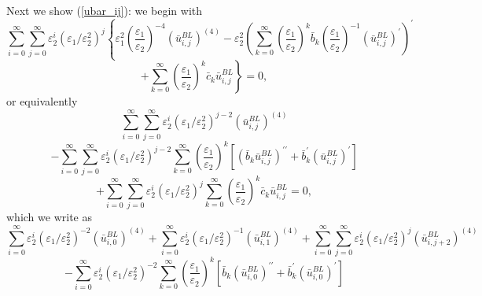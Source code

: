\documentclass[12pt]{article}
\begin{document}
Next we show (\ref{ubar_ij}): we begin with
%
\begin{equation*}
\sum_{i=0}^{\infty }\sum_{j=0}^{\infty }\varepsilon _{2}^{i}(\varepsilon
_{1}/\varepsilon _{2}^{2})^{j}\left\{ \varepsilon _{1}^{2}\left( \frac{\varepsilon
_{1}}{\varepsilon _{2}}\right) ^{-4}\left(\bar{u}^{BL}_{i,j}\right)^{(4)}-\varepsilon
_{2}^{2}\left( \sum_{k=0}^{\infty }\left( \frac{\varepsilon _{1}}{\varepsilon _{2}}%
\right) ^{k} \bar{b}_{k}\left( \frac{\varepsilon
_{1}}{\varepsilon _{2}}\right) ^{-1}\left(\bar{u}^{BL}_{i,j}\right)^{\prime }\right)
^{\prime } \right.
\end{equation*}
%
\begin{equation*}
\left. +\sum_{k=0}^{\infty }\left( \frac{\varepsilon _{1}}{\varepsilon
_{2}}\right) ^{k}\bar{c}_{k}\bar{u}^{BL}_{i,j}\right\} =0,
\end{equation*}
%
or equivalently
%
\begin{equation*}
\sum_{i=0}^{\infty }\sum_{j=0}^{\infty }\varepsilon _{2}^{i}(\varepsilon
_{1}/\varepsilon _{2}^{2})^{j-2}\left(\bar{u}^{BL}_{i,j}\right)^{(4)} 
\end{equation*}
\begin{equation*}
-\sum_{i=0}^{\infty
}\sum_{j=0}^{\infty }\varepsilon _{2}^{i}(\varepsilon _{1}/\varepsilon
_{2}^{2})^{j-2}\sum_{k=0}^{\infty }\left( \frac{\varepsilon _{1}}{\varepsilon _{2}}%
\right) ^{k}\left[ \left(\bar{b}_{k}\bar{u}^{BL}_{i,j}\right)^{\prime \prime }+\bar{b}_{k}^{\prime }\left(\bar{u}^{BL}_{i,j}\right)^{\prime }\right]
\end{equation*}
%
\begin{equation*}
+\sum_{i=0}^{\infty }\sum_{j=0}^{\infty }\varepsilon _{2}^{i}(\varepsilon
_{1}/\varepsilon _{2}^{2})^{j}\sum_{k=0}^{\infty }\left( \frac{\varepsilon
_{1}}{\varepsilon _{2}}\right) ^{k}\bar{c}_{k}\bar{u}^{BL}_{i,j}=0 ,
\end{equation*}
%
which we write as
%
\begin{equation*}
\sum_{i=0}^{\infty }\varepsilon _{2}^{i}(\varepsilon
_{1}/\varepsilon _{2}^{2})^{-2}\left(\bar{u}^{BL}_{i,0}\right)^{(4)}+\sum_{i=0}^{\infty }\varepsilon _{2}^{i}(\varepsilon
_{1}/\varepsilon _{2}^{2})^{-1}\left(\bar{u}^{BL}_{i,1}\right)^{(4)}+\sum_{i=0}^{\infty }\sum_{j=0}^{\infty }\varepsilon _{2}^{i}(\varepsilon
_{1}/\varepsilon _{2}^{2})^{j}\left(\bar{u}^{BL}_{i,j+2}\right)^{(4)}
\end{equation*}
%
\begin{equation*}-\sum_{i=0}^{\infty} \varepsilon _{2}^{i}(\varepsilon _{1}/\varepsilon
_{2}^{2})^{-2}\sum_{k=0}^{\infty }\left( \frac{\varepsilon _{1}}{\varepsilon _{2}}%
\right) ^{k}\left[ \bar{b}_{k}\left(\bar{u}^{BL}_{i,0}\right)^{\prime \prime }+\bar{b}_{k}^{\prime }\left(\bar{u}^{BL}_{i,0}\right)^{\prime }\right]
\end{equation*}
\end{document}
